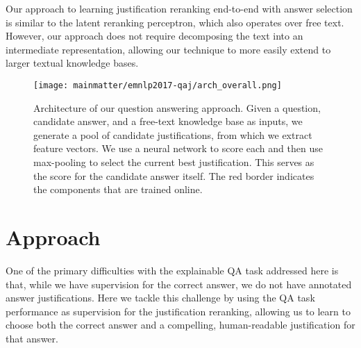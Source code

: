 Our approach to learning justification reranking end-to-end with answer selection is similar to the \citet{jansen2017framing} latent reranking perceptron,  which also operates over free text.  However, our approach does not require decomposing the text into an intermediate representation, allowing our technique to more easily extend to larger textual knowledge bases.  

 




\begin{figure}[t]
\begin{center}
\texttt{[image: mainmatter/emnlp2017-qaj/arch\_overall.png]}
\caption{ Architecture of our question answering approach.  
Given a question, candidate answer, and a free-text knowledge base as inputs, we generate a pool of candidate justifications, from which we extract feature vectors.  We use a neural network to score each and then use max-pooling to select the current best justification. This serves as the score for the candidate answer itself.  The red border indicates the components that are trained online. }
\label{fig:arch_overall}
\end{center}
\end{figure}

\section{Approach}
\label{sec-emnlp2017:approach}
One of the primary difficulties with the explainable QA task addressed here is that, while we have supervision for the correct answer, we do not have annotated answer justifications.  
Here we tackle this challenge by using the QA task performance as supervision for the justification reranking, allowing us to 
learn to choose both the correct answer and a compelling, human-readable justification for that answer.

